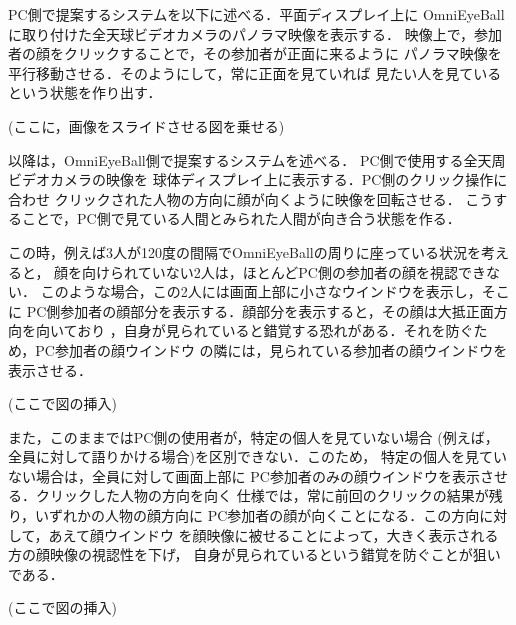 



PC側で提案するシステムを以下に述べる．平面ディスプレイ上に
OmniEyeBallに取り付けた全天球ビデオカメラのパノラマ映像を表示する．
映像上で，参加者の顔をクリックすることで，その参加者が正面に来るように
パノラマ映像を平行移動させる．そのようにして，常に正面を見ていれば
見たい人を見ているという状態を作り出す．

(ここに，画像をスライドさせる図を乗せる)

以降は，OmniEyeBall側で提案するシステムを述べる．
PC側で使用する全天周ビデオカメラの映像を
球体ディスプレイ上に表示する．PC側のクリック操作に合わせ
クリックされた人物の方向に顔が向くように映像を回転させる．
こうすることで，PC側で見ている人間とみられた人間が向き合う状態を作る．

この時，例えば3人が120度の間隔でOmniEyeBallの周りに座っている状況を考えると，
顔を向けられていない2人は，ほとんどPC側の参加者の顔を視認できない．
このような場合，この2人には画面上部に小さなウインドウを表示し，そこに
PC側参加者の顔部分を表示する．顔部分を表示すると，その顔は大抵正面方向を向いており
，自身が見られていると錯覚する恐れがある．それを防ぐため，PC参加者の顔ウインドウ
の隣には，見られている参加者の顔ウインドウを表示させる．

(ここで図の挿入)

また，このままではPC側の使用者が，特定の個人を見ていない場合
(例えば，全員に対して語りかける場合)を区別できない．このため，
特定の個人を見ていない場合は，全員に対して画面上部に
PC参加者のみの顔ウインドウを表示させる．クリックした人物の方向を向く
仕様では，常に前回のクリックの結果が残り，いずれかの人物の顔方向に
PC参加者の顔が向くことになる．この方向に対して，あえて顔ウインドウ
を顔映像に被せることによって，大きく表示される方の顔映像の視認性を下げ，
自身が見られているという錯覚を防ぐことが狙いである．

(ここで図の挿入)